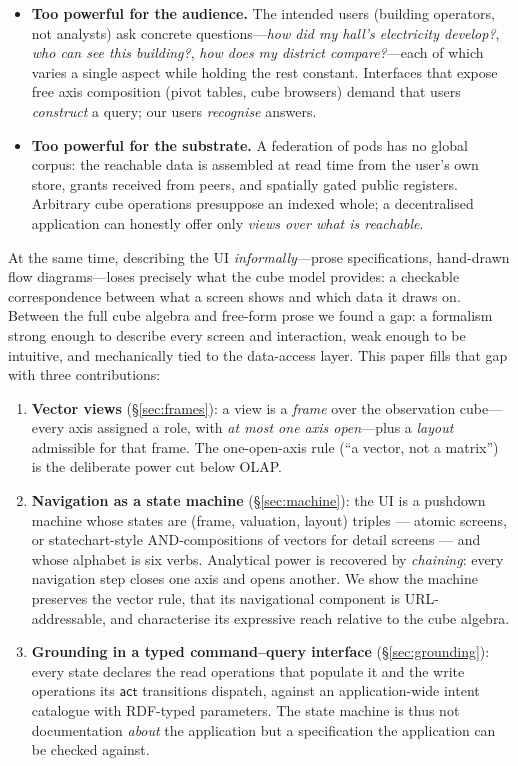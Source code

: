 \documentclass[11pt,a4paper]{article}
\theoremstyle{remark}
\newcommand{\vact}{\mathsf{act}}
\begin{document}
\begin{itemize}
\item \textbf{Too powerful for the audience.} The intended users (building
  operators, not analysts) ask concrete questions---\emph{how did my hall's
  electricity develop?}, \emph{who can see this building?}, \emph{how does my
  district compare?}---each of which varies a single aspect while holding the rest
  constant. Interfaces that expose free axis composition (pivot tables, cube
  browsers) demand that users \emph{construct} a query; our users \emph{recognise}
  answers.
\item \textbf{Too powerful for the substrate.} A federation of pods has no global
  corpus: the reachable data is assembled at read time from the user's own store,
  grants received from peers, and spatially gated public registers. Arbitrary cube
  operations presuppose an indexed whole; a decentralised application can honestly
  offer only \emph{views over what is reachable}.
\end{itemize}

At the same time, describing the UI \emph{informally}---prose specifications,
hand-drawn flow diagrams---loses precisely what the cube model provides: a checkable
correspondence between what a screen shows and which data it draws on. Between the
full cube algebra and free-form prose we found a gap: a formalism strong enough to
describe every screen and interaction, weak enough to be intuitive, and mechanically
tied to the data-access layer. This paper fills that gap with three contributions:

\begin{enumerate}
\item \textbf{Vector views} (\S\ref{sec:frames}): a view is a \emph{frame} over the
  observation cube---every axis assigned a role, with \emph{at most one axis
  open}---plus a \emph{layout} admissible for that frame. The one-open-axis
  rule (``a vector, not a matrix'') is the deliberate power cut below OLAP.
\item \textbf{Navigation as a state machine} (\S\ref{sec:machine}): the UI is a
  pushdown machine whose states are (frame, valuation, layout) triples --- atomic
  screens, or statechart-style AND-compositions of vectors for detail screens ---
  and whose alphabet is six verbs. Analytical power is recovered by \emph{chaining}: every
  navigation step closes one axis and opens another. We show the machine preserves
  the vector rule, that its navigational component is URL-addressable, and
  characterise its expressive reach relative to the cube algebra.
\item \textbf{Grounding in a typed command--query interface} (\S\ref{sec:grounding}):
  every state declares the read operations that populate it and the write operations
  its $\vact$ transitions dispatch, against an application-wide intent catalogue with
  RDF-typed parameters. The state machine is thus not documentation \emph{about} the
  application but a specification the application can be checked against.
\end{enumerate}
\end{document}
